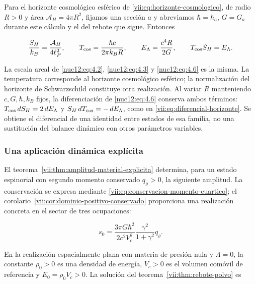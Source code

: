 Para el horizonte cosmológico esférico de \eqref{vii:eq:horizonte-cosmologico}, de radio \(R>0\) y área \(\mathcal A_H=4\pi R^2\), fijamos una sección \(a\) y abreviamos \(\hbar=\hbar_a\), \(G=G_a\) durante este cálculo y el del rebote que sigue. Entonces



\begin{equation}
\frac{S_H}{k_B}=\frac{\mathcal A_H}{4\ell_P^2},\qquad
T_{\rm cos}=\frac{\hbar c}{2\pi k_BR},\qquad
E_\Lambda=\frac{c^4R}{2G},\qquad T_{\rm cos}S_H=E_\Lambda .
\label{nuc12:eq:4.6}
\end{equation}



La escala areal de \eqref{nuc12:eq:4.2}, \eqref{nuc12:eq:4.3} y \eqref{nuc12:eq:4.6} es la misma. La temperatura corresponde al horizonte cosmológico esférico; la normalización del horizonte de Schwarzschild constituye otra realización. Al variar \(R\) manteniendo \(c,G,\hbar,k_B\) fijos, la diferenciación de \eqref{nuc12:eq:4.6} conserva ambos términos: \(T_{\rm cos}\,dS_H=2\,dE_\Lambda\) y \(S_H\,dT_{\rm cos}=-\,dE_\Lambda\), como en \eqref{vii:eq:diferencial-horizonte}. Se obtiene el diferencial de una identidad entre estados de esa familia, no una sustitución del balance dinámico con otros parámetros variables.

\subsubsection{Una aplicación dinámica explícita}

El teorema~\ref{vii:thm:amplitud-material-explicita} determina, para un estado espinorial con segundo momento conservado \(q_\varrho>0\), la siguiente amplitud. La conservación se expresa mediante \eqref{vii:eq:conservacion-momento-cuartico}; el corolario~\ref{vii:cor:dominio-positivo-conservado} proporciona una realización concreta en el sector de tres ocupaciones:



\begin{equation}
s_0=\frac{3\pi G\hbar^2}{2c^2V_c^2}
\frac{\gamma^2}{1+\gamma^2}q_\varrho .
\label{nuc12:eq:4.7}
\end{equation}



En la realización espacialmente plana con materia de presión nula y \(\Lambda=0\), la constante \(\rho_0>0\) es una densidad de energía, \(V_c>0\) es el volumen comóvil de referencia y \(E_0=\rho_0V_c>0\). La solución del teorema~\ref{vii:thm:rebote-polvo} es



